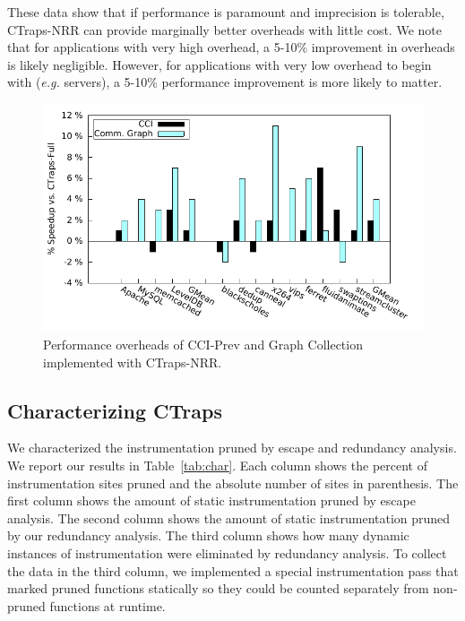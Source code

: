 \documentclass[preprint,9pt]{sigplanconf}
\newcommand{\ctraps}{CTraps\xspace}
\newcommand{\ctrapsmm}{CTraps-NRR\xspace}
\begin{document}
These data show that if performance is paramount and imprecision is tolerable,
\ctrapsmm can provide marginally better overheads with little cost.  We note
that for applications with very high overhead, a 5-10\% improvement in
overheads is likely negligible.  However, for applications with very low
overhead to begin with ({\em e.g.} servers), a 5-10\%
performance improvement is more likely to matter.

\begin{figure}
\centering
\includegraphics[width=.9\columnwidth]{plots/appmm.pdf}
\caption{\label{fig:perfcci}Performance overheads of CCI-Prev and Graph Collection implemented with \ctrapsmm.}
\end{figure}


\subsection{Characterizing \ctraps}
\label{sec:char}
We characterized the instrumentation pruned by escape and redundancy analysis.
We report our results in Table~\ref{tab:char}.  Each column shows the percent
of instrumentation sites pruned and the absolute number of sites in
parenthesis.  The first column shows the amount of static instrumentation
pruned by escape analysis.  The second column shows the amount of static
instrumentation pruned by our redundancy analysis.  The third column shows how
many dynamic instances of instrumentation were eliminated by redundancy analysis.  To
collect the data in the third column, we implemented a special instrumentation
pass that marked pruned functions statically so they could be counted
separately from non-pruned functions at runtime.
\end{document}
